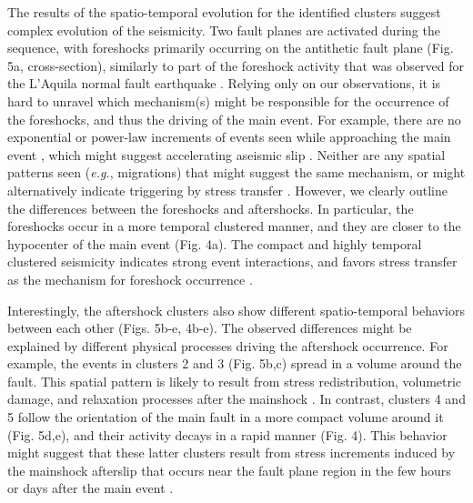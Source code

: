 \documentclass[a4paper,12pt,twoside]{article}
\begin{document}
The results of the spatio-temporal evolution for the identified clusters suggest complex evolution of the seismicity. Two fault planes are activated during the sequence, with foreshocks primarily occurring on the antithetic fault plane (Fig. 5a, cross-section), similarly to part of the foreshock activity that was observed for the L'Aquila normal fault earthquake \citep{Chiaraluce_2011_AAN}. Relying only on our observations, it is hard to unravel which mechanism(s) might be responsible for the occurrence of the foreshocks, and thus the driving of the main event. For example, there are no exponential or power-law increments of events seen while approaching the main event \citep{Papazachos_1975_FEP,Kagan_1978_SSO}, which might suggest accelerating aseismic slip \citep{Dodge_1996_DOC, Bouchon_2011_ENI, Tape_2018_ENF}. Neither are any spatial patterns seen (\emph{e.g.}, migrations) that might suggest the same mechanism, or might alternatively indicate triggering by stress transfer \citep{Dodge_1996_DOC, Ellsworth_2018_NIE, Yoon_2019_FMN}. However, we clearly outline the differences between the foreshocks and aftershocks. In particular, the foreshocks occur in a more temporal clustered manner, and they are closer to the hypocenter of the main event (Fig. 4a). The compact and highly temporal clustered seismicity indicates strong event interactions, and favors stress transfer as the mechanism for foreshock occurrence \citep[COV,][]{Schoenball_2017_SAS}.

Interestingly, the aftershock clusters also show different spatio-temporal behaviors between each other (Figs. 5b-e, 4b-e). The observed differences might be explained by different physical processes driving the aftershock occurrence. For example, the events in clusters 2 and 3 (Fig. 5b,c) spread in a volume around the fault. This spatial pattern is likely to result from stress redistribution, volumetric damage, and relaxation processes after the mainshock \citep{trugman2020imaging}. In contrast, clusters 4 and 5 follow the orientation of the main fault in a more compact volume around it (Fig. 5d,e), and their activity decays in a rapid manner (Fig. 4). This behavior might suggest that these latter clusters result from stress increments induced by the mainshock afterslip that occurs near the fault plane region in the few hours or days after the main event \citep{Stein_1983_HVE, Shen_1994_PDF}.
\end{document}
